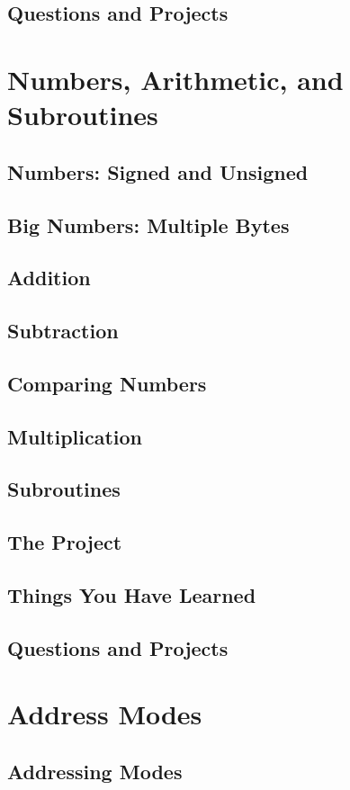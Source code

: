 \documentclass[11pt,a4paper,titlepage]{memoir}
\begin{document}
\section{Questions and Projects} 
\blindtext
\chapter{Numbers, Arithmetic, and Subroutines}
\section{Numbers: Signed and Unsigned}
\section{Big Numbers: Multiple Bytes}
\section{Addition}
\section{Subtraction}
\section{Comparing Numbers}
\section{Multiplication}
\section{Subroutines}
\section{The Project}
\section{Things You Have Learned}
\section{Questions and Projects}
\chapter{Address Modes}
\section{Addressing Modes}
\end{document}
